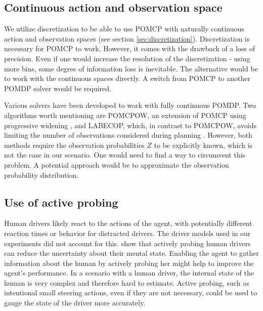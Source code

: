 \subsection{Continuous action and observation space}
\label{sec:conclusion-continuous}

We utilize discretization to be able to use POMCP with naturally continuous action and observation spaces (see section \ref{sec:discretization}). Discretization is necessary for POMCP to work. However, it comes with the drawback of a loss of precision. Even if one would increase the resolution of the discretization - using more bins, some degree of information loss is inevitable. The alternative would be to work with the continuous spaces directly. A switch from POMCP to another POMDP solver would be required.

Various solvers have been developed to work with fully continuous POMDP. Two algorithms worth mentioning are POMCPOW, an extension of POMCP using progressive widening \parencite{online_pomdp_cont}, and LABECOP, which, in contrast to POMCPOW, avoids limiting the number of observations considered during planning \parencite{online-cont-pomdp-2}. However, both methods require the observation probabilities $Z$ to be explicitly known, which is not the case in our scenario. One would need to find a way to circumvent this problem. A potential approach would be to approximate the observation probability distribution.

\subsection{Use of active probing}

Human drivers likely react to the actions of the agent, with potentially different reaction times or behavior for distracted drivers. The driver models used in our experiments did not account for this. \cite{att_intersec} show that actively probing human drivers can reduce the uncertainty about their mental state. Enabling the agent to gather information about the human by actively probing her might help to improve the agent's performance. In a scenario with a human driver, the internal state of the human is very complex and therefore hard to estimate. Active probing, such as intentional small steering actions, even if they are not necessary, could be used to gauge the state of the driver more accurately.




